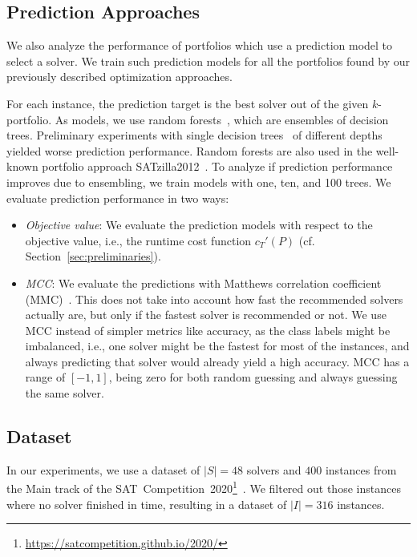 \documentclass[conference]{IEEEtran}
\begin{document}
\subsection{Prediction Approaches}

We also analyze the performance of portfolios which use a prediction model to select a solver. 
We train such prediction models for all the portfolios found by our previously described optimization approaches. 

For each instance, the prediction target is the best solver out of the given $k$-portfolio.
As models, we use random forests~\cite{breiman2001random}, which are ensembles of decision trees. 
Preliminary experiments with single decision trees~\cite{breiman1984classification} of different depths yielded worse prediction performance. 
Random forests are also used in the well-known portfolio approach SATzilla2012~\cite{xu2012satzilla2012}. 
To analyze if prediction performance improves due to ensembling, we train models with one, ten, and 100 trees.
We evaluate prediction performance in two ways:

\begin{itemize}
	\item \emph{Objective value}:
	We evaluate the prediction models with respect to the objective value, i.e., the runtime cost function $c_{T}'(P)$ (cf. Section~\ref{sec:preliminaries}). 
	\item \emph{MCC}:
	We evaluate the predictions with Matthews correlation coefficient (MMC)~\cite{matthews1975comparison, gorodkin2004comparing}.
	This does not take into account how fast the recommended solvers actually are, but only if the fastest solver is recommended or not.
	We use MCC instead of simpler metrics like accuracy, as the class labels might be imbalanced, i.e., one solver might be the fastest for most of the instances, and always predicting that solver would already yield a high accuracy.
	MCC has a range of $[-1,1]$, being zero for both random guessing and always guessing the same solver.
\end{itemize}

\subsection{Dataset}

In our experiments, we use a dataset of $|S| = 48$ solvers and $400$ instances from the Main track of the SAT~Competition~2020\footnote{\url{https://satcompetition.github.io/2020/}}~\cite{balyo2020proceedings, SC2020:AIJ}. 
We filtered out those instances where no solver finished in time, resulting in a dataset of $|I| = 316$ instances. 
\end{document}
